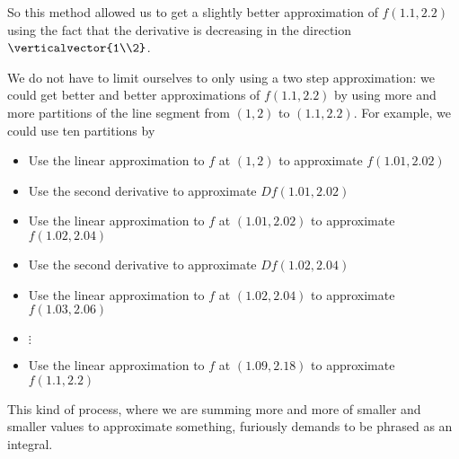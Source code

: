 \documentclass{ximera}
\begin{document}
\begin{question}
		So this method allowed us to get a slightly better approximation of $f(1.1,2.2)$ using the fact that the derivative is decreasing
		in the direction $\verticalvector{1\\2}$. 
		
		We do not have to limit ourselves to only using a two step approximation:  we could get better and better approximations of $f(1.1,2.2)$
		by using more and more partitions of the line segment from $(1,2)$ to $(1.1,2.2)$.  For example, we could use ten partitions by
		\begin{itemize}
			\item Use the linear approximation to $f$ at $(1,2)$ to approximate $f(1.01,2.02)$
			\item Use the second derivative to approximate $Df(1.01,2.02)$
			\item Use the linear approximation to $f$ at $(1.01,2.02)$ to approximate $f(1.02,2.04)$
			\item Use the second derivative to approximate $Df(1.02,2.04)$
			\item Use the linear approximation to $f$ at $(1.02,2.04)$ to approximate $f(1.03,2.06)$
			\item $\vdots$
			\item  Use the linear approximation to $f$ at $(1.09,2.18)$ to approximate $f(1.1,2.2)$
		\end{itemize}
		
		This kind of process, where we are summing more and more of smaller and smaller values to approximate something, 
		furiously demands to be phrased as an integral.
		

\end{question}
\end{document}
